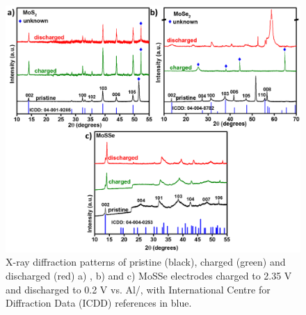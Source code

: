\begin{figure}
  \centering
  \includegraphics[width=\textwidth]{Figures/chap4fig/fig3}
  \caption{X-ray diffraction patterns of pristine (black), charged (green) and discharged (red) a) , b)  and c) MoSSe electrodes charged to 2.35 V and discharged to 0.2 V vs. Al/, with International Centre for Diffraction Data (ICDD) references in blue.}
  \label{Figures/chap4fig:fig3}
\end{figure}

